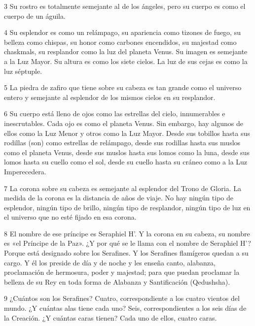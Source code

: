 \par 3 Su rostro es totalmente semejante al de los ángeles, pero su cuerpo es como el cuerpo de un águila.

\par 4 Su esplendor es como un relámpago, su apariencia como tizones de fuego, su belleza como chispas, su honor como carbones encendidos, su majestad como chaskmals, su resplandor como la luz del planeta Venus. Su imagen es semejante a la Luz Mayor. Su altura es como los siete cielos. La luz de sus cejas es como la luz séptuple.

\par 5 La piedra de zafiro que tiene sobre su cabeza es tan grande como el universo entero y semejante al esplendor de los mismos cielos en su resplandor.

\par 6 Su ​​cuerpo está lleno de ojos como las estrellas del cielo, innumerables e inescrutables. Cada ojo es como el planeta Venus. Sin embargo, hay algunos de ellos como la Luz Menor y otros como la Luz Mayor. Desde sus tobillos hasta sus rodillas (son) como estrellas de relámpago, desde sus rodillas hasta sus muslos como el planeta Venus, desde sus muslos hasta sus lomos como la luna, desde sus lomos hasta su cuello como el sol, desde su cuello hasta su cráneo como a la Luz Imperecedera.

\par 7 La corona sobre su cabeza es semejante al esplendor del Trono de Gloria. La medida de la corona es la distancia de años de viaje. No hay ningún tipo de esplendor, ningún tipo de brillo, ningún tipo de resplandor, ningún tipo de luz en el universo que no esté fijado en esa corona.

\par 8 El nombre de ese príncipe es Seraphiel H'. Y la corona en su cabeza, su nombre es «el Príncipe de la Paz». ¿Y por qué se le llama con el nombre de Seraphiel H'? Porque está designado sobre los Serafines. Y los Serafines flamígeros quedan a su cargo. Y él los preside de día y de noche y les enseña canto, alabanza, proclamación de hermosura, poder y majestad; para que puedan proclamar la belleza de su Rey en toda forma de Alabanza y Santificación (Qedushsha).

\par 9 ¿Cuántos son los Serafines? Cuatro, correspondiente a los cuatro vientos del mundo. ¿Y cuántas alas tiene cada uno? Seis, correspondientes a los seis días de la Creación. ¿Y cuántas caras tienen? Cada uno de ellos, cuatro caras.

